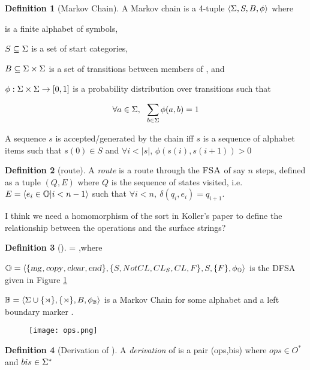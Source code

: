 \documentclass[12pt]{article}
\theoremstyle{definition}
\newtheorem{definition}{Definition}[section]
\begin{document}
\begin{definition}[Markov Chain]
  A Markov chain is a 4-tuple $\langle \Sigma, S, B, \phi  \rangle $ where 

\sg  is a finite alphabet of symbols, 

$S\subseteq \Sigma$ is a set of start categories,
 
$B\subseteq \Sigma\times\Sigma$ is a set of transitions between members of \sg, and

$\phi: \Sigma \times \Sigma \rightarrow [0,1]$ is a probability distribution over transitions such that

$$\forall a\in \Sigma,~~\sum_{b\in\Sigma} \phi(a,b) = 1 $$


A sequence $s$ is accepted/generated by the chain iff $s$ is a sequence of alphabet items such that $s(0) \in S$ and $\forall i<|s|$, $\phi(s(i),s(i+1))>0$ 

\end{definition}

\begin{definition}[route]
  A \emph{route} is a route through the $\textsc{FSA}$ of say $n$ steps, defined as a tuple $(Q,E)$ where $Q$ is the sequence of states visited, i.e.
 $E=\langle e_i\in\mathbb{O}|i<n-1\rangle$ such that $\forall i<n,~ \delta(q_i,e_i)=q_{i+1}$.

\end{definition}

  I think we need a homomorphism of the sort in Koller's paper to define the relationship between the operations and the surface strings?


\begin{definition}[\OURG]
  \OURG = \la \OPS,\BIGR\ra  where

  $\mathbb{O} = \langle \{\text{\textsl{mg}},\text{\textsl{copy}},\text{\textsl{clear}},\text{\textsl{end}}\}, \{S,NotCL,CL_S,CL,F\}, S, \{F\}, \phi_\mathbb{O}\rangle$ is the DFSA given in Figure \ref{fig:ops}

  $\mathbb{B} = \langle \Sigma\cup\{{\rtimes}\}, \{\rtimes\}, B, \phi_\mathbb{B} \rangle$ is a Markov Chain  for some alphabet \sg and a left boundary marker \LBOUND.
  
\end{definition}


\begin{figure}[H]
  \centering
  \texttt{[image: ops.png]}
  \caption{\OPS}
  \label{fig:ops}
\end{figure}


\begin{definition}[Derivation of \OURG]
  A \textit{derivation} of \OURG is a pair (ops,bis) where $ops\in O^*$ and $bis\in\Sigma^*$
\end{definition}
\end{document}
